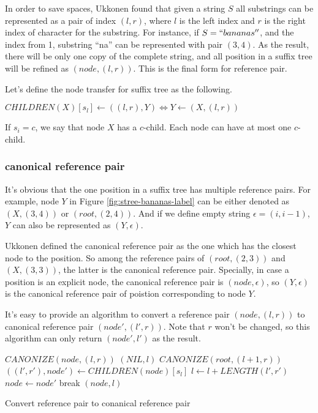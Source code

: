 \documentclass{article}
\begin{document}
In order to save spaces, Ukkonen found that given a string $S$ all substrings can
be represented as a pair of index $(l, r)$, where $l$ is the left index and $r$ is the 
right index of character for the substring. For instance, if $S=``bananas''$, and the
index from 1, substring ``na'' can be represented with pair $(3, 4)$. As the result,
there will be only one copy of the complete string, and all position in a suffix tree
will be refined as $(node, (l, r))$. This is the final form for reference pair.

Let's define the node transfer for suffix tree as the following.

$CHILDREN(X)[s_l] \leftarrow ((l, r), Y) \iff Y \leftarrow (X, (l, r))$

If $s_i=c$, we say that node $X$ has a $c$-child. Each node can have at most one $c$-child.

\subsubsection{canonical reference pair}

It's obvious that the one position in a suffix tree has multiple reference pairs.
For example, node $Y$ in Figure \ref{fig:stree-bananas-label} can be either
denoted as $(X, (3, 4))$ or $(root, (2, 4))$. And if we define empty string 
$\epsilon=(i, i-1)$, $Y$ can also be represented as $(Y, \epsilon)$.

Ukkonen defined the canonical reference pair as the one which has the closest node
to the position. So among the reference pairs of $(root, (2, 3))$ and $(X, (3, 3))$,
the latter is the canonical reference pair. Specially, in case a position is an
explicit node, the canonical reference pair is $(node, \epsilon)$, so $(Y, \epsilon)$
is the canonical reference pair of poistion corresponding to node $Y$.

It's easy to provide an algorithm to convert a reference pair $(node, (l, r))$ 
to canonical reference pair $(node', (l', r))$. Note that $r$ won't be changed,
so this algorithm can only return $(node', l')$ as the result.

\begin{algorithm}
\begin{algorithmic}
\STATE $CANONIZE(node, (l, r))$
      \RETURN $(NIL, l)$
    \ELSE
      \RETURN $CANONIZE(root, (l+1, r))$
    \ENDIF
  \ENDIF
    \STATE $((l', r'), node') \leftarrow CHILDREN(node)[s_l]$
      \STATE $l \leftarrow l+LENGTH(l', r')$
      \STATE $node \leftarrow node'$
    \ELSE
      \STATE break
    \ENDIF
  \ENDWHILE
  \RETURN $(node, l)$
\end{algorithmic}
\caption{Convert reference pair to conanical reference pair}
\label{algo:strie1}
\end{algorithm}
\end{document}
